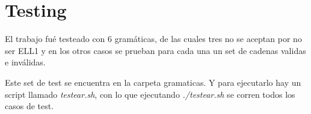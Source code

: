 \documentclass[a4paper]{report}
\begin{document}
\section*{Testing}

El trabajo fué testeado con 6 gramáticas, de las cuales tres no se aceptan por no ser ELL1 y en los otros casos se prueban para cada una un set de cadenas validas e inválidas.

Este set de test se encuentra en la carpeta gramaticas. Y para ejecutarlo hay un script llamado \emph{testear.sh}, con lo que ejecutando \emph{./testear.sh} se corren todos los casos de test.
\end{document}
